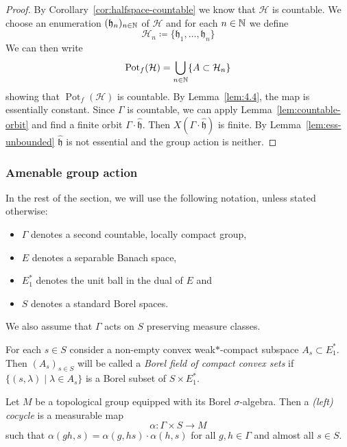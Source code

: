 \begin{proof}
  By Corollary~\ref{cor:halfspace-countable} we know that \(\mathcal{H}\) is countable. We choose an enumeration \((\mathfrak{h}_n)_{n \in \mathbb{N}}\) of \(\mathcal{H}\) and for each \(n \in \mathbb{N}\) we define
  \[
    \mathcal{H}_n \coloneqq \{\mathfrak{h}_1, \dots, \mathfrak{h}_n\}
  \]
  We can then write
  \[
    \operatorname{Pot}_f(\mathcal{H}) = \bigcup_{n \in \mathbb{N}} \{A \subset \mathcal{H}_n\}
  \]
  showing that \(\operatorname{Pot}_f(\mathcal{H})\) is countable. By Lemma~\ref{lem:4.4}, the map is essentially constant. Since \(\Gamma\) is countable, we can apply Lemma~\ref{lem:countable-orbit} and find a finite orbit \(\Gamma\cdot \mathfrak{\hat h}\). Then \(X(\Gamma \cdot \mathfrak{\hat h})\) is finite. By Lemma~\ref{lem:ess-unbounded} \(\mathfrak{\hat h}\) is not essential and the group action is neither.
\end{proof}

\subsubsection*{Amenable group action}
\label{sec:amenable}

In the rest of the section, we will use the following notation, unless stated otherwise:
\begin{itemize}
\item \(\Gamma\) denotes a second countable, locally compact group,
\item \(E\) denotes a separable Banach space,
\item \(E^\ast_1\) denotes the unit ball in the dual of \(E\) and
\item \(S\) denotes a standard Borel spaces.
\end{itemize}
We also assume that \(\Gamma\) acts on \(S\) preserving measure classes.

\begin{defin}
  For each \(s \in S\) consider a non-empty convex weak\(\ast\)-compact subspace \(A_s \subset E^\ast_1\). Then \((A_s)_{s \in S}\) will be called a \emph{Borel field of compact convex sets} if \(\{(s, \lambda) \mid \lambda \in A_s\}\) is a Borel subset of \(S \times E^\ast_1\).  
\end{defin}

\begin{defin}
  Let \(M\) be a topological group equipped with its Borel \(\sigma\)-algebra. Then a \emph{(left) cocycle} is a measurable map
  \[
    \alpha \colon \Gamma \times S \to M
  \]
  such that \(\alpha(gh, s) = \alpha(g, hs)\cdot \alpha(h, s)\) for all \(g, h \in \Gamma\) and almost all \(s \in S\).
\end{defin}

